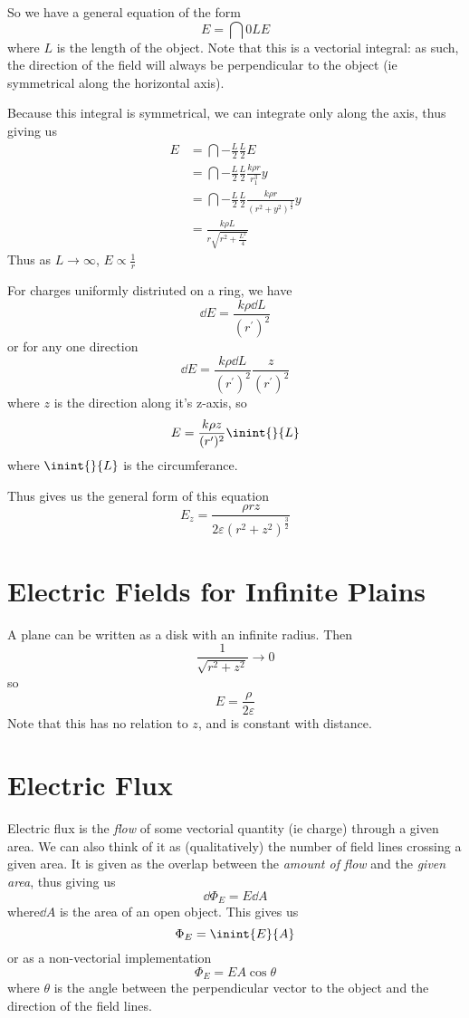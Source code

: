 \documentclass[12pt]{article}
\begin{document}
So we have a general equation of the form \[ E = \dint{0}{L}{}{E} \] where $L$ is the length of the object. Note that this is a vectorial integral: as such, the direction of the field will always be perpendicular to the object (ie symmetrical along the horizontal axis).

Because this integral is symmetrical, we can integrate only along the axis, thus giving us
\begin{align*}
E &= \dint{-\frac{L}{2}}{\frac{L}{2}}{}{E}\\
  &= \dint{-\frac{L}{2}}{\frac{L}{2}}{\frac{k \rho r}{r_1^3}}{y}\\
  &= \dint{-\frac{L}{2}}{\frac{L}{2}}{\frac{k \rho r}{(r^2 + y^2)^{\frac{3}{2}}}}{y}\\
  &= \frac{k \rho L}{r\sqrt{r^2 + \frac{L^2}{4}}}
\end{align*}
Thus as $L \to \infty$, $E \propto \frac{1}{r}$

For charges uniformly distriuted on a ring, we have \[ \dd E = \frac{k \rho \dd L}{(r^\prime)^2} \]
or for any one direction \[ \dd E = \frac{k \rho \dd L}{(r^\prime)^2} \frac{z}{(r^\prime)^2} \] where $z$ is the direction along it's z-axis, so \[ E = \frac{k \rho z}{(r^\prime)^2} \inint{}{L} \] where $\inint{}{L}$ is the circumferance.

Thus gives us the general form of this equation \[ E_z = \frac{\rho rz}{2\varepsilon(r^2 + z^2)^{\frac{3}{2}}} \]

\section*{Electric Fields for Infinite Plains}
A plane can be written as a disk with an infinite radius. Then \[ \frac{1}{\sqrt{r^2 + z^2}} \to 0 \] so \[ E = \frac{\rho}{2\varepsilon} \] Note that this has no relation to $z$, and is constant with distance.

\section*{Electric Flux}
Electric flux is the \emph{flow} of some vectorial quantity (ie charge) through a given area. We can also think of it as (qualitatively) the number of field lines crossing a given area. It is given as the overlap between the \emph{amount of flow} and the \emph{given area}, thus giving us \[ \dd\Phi_E = E \dd A \] where$\dd A$ is the area of an open object. This gives us \[ \Phi_E = \inint{E}{A} \] or as a non-vectorial implementation \[ \Phi_E = EA\cos\theta \] where $\theta$ is the angle between the perpendicular vector to the object and the direction of the field lines.
\end{document}
